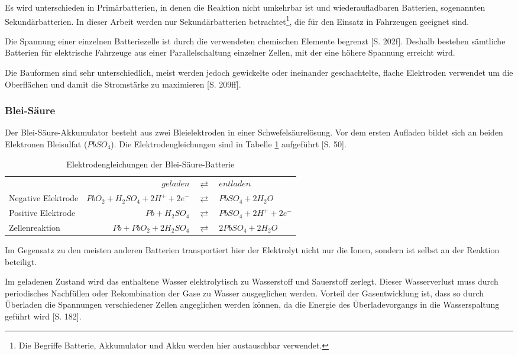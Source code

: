 Es wird unterschieden in Primärbatterien, in denen die Reaktion nicht umkehrbar ist und wiederaufladbaren Batterien, sogenannten Sekundärbatterien. In dieser Arbeit werden nur Sekundärbatterien betrachtet\footnote{Die Begriffe Batterie, Akkumulator und Akku werden hier austauschbar verwendet.}, die für den Einsatz in Fahrzeugen geeignet sind.

Die Spannung einer einzelnen Batteriezelle ist durch die verwendeten chemischen Elemente begrenzt \cite{Sterner:2014}[S. 202f]. Deshalb bestehen sämtliche Batterien für elektrische Fahrzeuge aus einer Parallelschaltung einzelner Zellen, mit der eine höhere Spannung erreicht wird.

Die Bauformen sind sehr unterschiedlich, meist werden jedoch gewickelte oder ineinander geschachtelte, flache Elektroden verwendet um die Oberflächen und damit die Stromstärke zu maximieren \cite{Sterner:2014}[S. 209ff].

\subsubsection{Blei-Säure}
Der Blei-Säure-Akkumulator besteht aus zwei Bleielektroden in einer Schwefelsäurelösung. Vor dem ersten Aufladen bildet sich an beiden Elektronen Bleisulfat ($PbSO_4$). Die Elektrodengleichungen sind in Tabelle \ref{Pb} aufgeführt \cite{KiehneBattery}[S. 50].

\begin{table}\centering
	\begin{tabularx}{\linewidth}{XrcX}
		&                       $geladen$ & $\rightleftarrows$ & $entladen$             \\
		Negative Elektrode & $PbO_2 + H_2SO_4 + 2H^+ + 2e^-$ & $\rightleftarrows$ & $PbSO_4 + 2H_2O$       \\
		Positive Elektrode &                  $Pb + H_2SO_4$ & $\rightleftarrows$ & $PbSO_4 + 2H^+ + 2e^-$ \\ \midrule
		Zellenreaktion     &         $Pb + PbO_2 + 2H_2SO_4$ & $\rightleftarrows$ & $2PbSO_4 + 2H_2O$      \\
	\end{tabularx}
	\caption{Elektrodengleichungen der Blei-Säure-Batterie}
	\label{Pb}
\end{table}

Im Gegensatz zu den meisten anderen Batterien transportiert hier der Elektrolyt nicht nur die Ionen, sondern ist selbst an der Reaktion beteiligt.

Im geladenen Zustand wird das enthaltene Wasser elektrolytisch zu Wasserstoff und Sauerstoff zerlegt. Dieser Wasserverlust muss durch periodisches Nachfüllen oder Rekombination der Gase zu Wasser ausgeglichen werden. Vorteil der Gasentwicklung ist, dass so durch Überladen die Spannungen verschiedener Zellen angeglichen werden können, da die Energie des Überladevorgangs in die Wasserspaltung geführt wird \cite{tub_aleph001746639}[S. 182].

